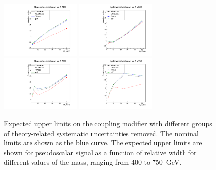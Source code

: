\begin{figure}[!Hhtb]
\centering
\includegraphics[width=0.35\textwidth,keepaspectratio=true]{fig/app5/breakdowns/theory_breakdown_A_M400.pdf}
\includegraphics[width=0.35\textwidth,keepaspectratio=true]{fig/app5/breakdowns/theory_breakdown_A_M500.pdf}
\includegraphics[width=0.35\textwidth,keepaspectratio=true]{fig/app5/breakdowns/theory_breakdown_A_M600.pdf}
\includegraphics[width=0.35\textwidth,keepaspectratio=true]{fig/app5/breakdowns/theory_breakdown_A_M750.pdf}
\caption{Expected upper limits on the coupling modifier with different groups of theory-related systematic uncertainties removed. The nominal limits are shown as the blue curve. The expected upper limits are shown for pseudoscalar signal as a function of relative width for different values of the mass, ranging from 400 to 750~GeV.}
\label{fig:theory_breakdown_amass}
\end{figure}



